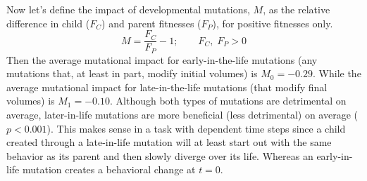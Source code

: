 Now let's define the impact of developmental mutations, $M$, as the relative difference in child ($F_C$) and parent fitnesses ($F_P$), for positive fitnesses only.
\begin{equation}
M = \frac{F_C }{F_P}-1; \qquad F_C, \; F_P>0
\end{equation}
Then the average mutational impact for early-in-the-life mutations (any mutations that, at least in part, modify initial volumes) is $M_0=-0.29$.
While the average mutational impact for late-in-the-life mutations (that modify final volumes) is $M_1=-0.10$.
Although both types of mutations are detrimental on average, later-in-life mutations are more beneficial (less detrimental) on average ($p<0.001$).
This makes sense in a task with dependent time steps since a child created through a late-in-life mutation will at least start out with the same behavior as its parent and then slowly diverge over its life. Whereas an early-in-life mutation creates a behavioral change at $t=0$.







